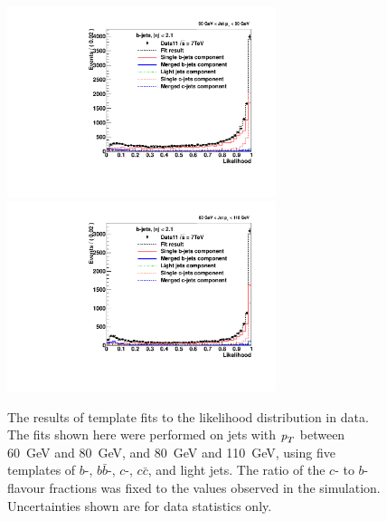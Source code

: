 \begin{figure}[tp]
\centering
\includegraphics[width=0.7\textwidth]{FIGS/Fits/LikelihoodFit_3param_ETAFull_Bin1.pdf}
\includegraphics[width=0.7\textwidth]{FIGS/Fits/LikelihoodFit_3param_ETAFull_Bin2.pdf}
\caption{The results of template fits to the likelihood distribution in data. The fits shown here were performed on jets with ${\emph{p}_{T}}$ between  60~GeV and 80~GeV, and 80~GeV and 110~GeV, using five templates of $b$-, $b\bar{b}$-, $c$-, $c\bar{c}$, and light jets.  The ratio of the $c$- to $b$-flavour fractions was fixed to the values observed in the simulation.  Uncertainties shown are for data statistics only.  }
\label{fig:fittemplates1}
\end{figure}



